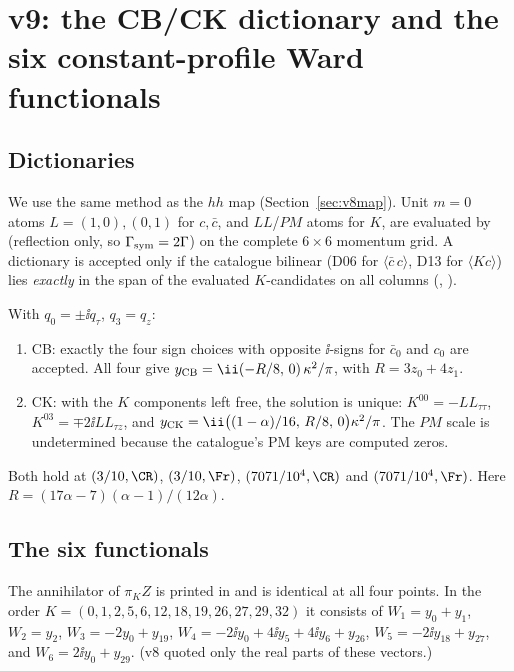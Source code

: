 \section{v9: the CB/CK dictionary and the six constant-profile Ward functionals}
\label{sec:v9ghost}

\subsection{Dictionaries}

We use the same method as the \(hh\) map (Section~\ref{sec:v8map}).
Unit \(m=0\) atoms \(L=(1,0),(0,1)\) for \(c,\bar c\), and
\(LL\)/\(PM\) atoms for \(K\), are evaluated by 
(reflection only, so \(\Gamma_{\rm sym}=2\Gamma\)) on the complete
\(6\times6\) momentum grid. A dictionary is accepted only if the
catalogue bilinear (D06 for \(\langle\bar c\,c\rangle\), D13 for
\(\langle K c\rangle\)) lies \emph{exactly} in the span of the
evaluated \(K\)-candidates on all columns
(, ).

\begin{proposition}
\label{prop:v9dict}
With \(q_0=\pm\ii q_\tau\), \(q_3=q_z\):
\begin{enumerate}[label=(\roman*)]
\item CB: exactly the four sign choices with opposite \(\ii\)-signs
for \(\bar c_0\) and \(c_0\) are accepted. All four give
\(y_{\rm CB}=\ii(-R/8,\,0)\,\kappa^2/\pi\), with \(R=3z_0+4z_1\).
\item CK: with the \(K\) components left free, the solution is
unique: \(K^{00}=-LL_{\tau\tau}\), \(K^{03}=\mp2\ii LL_{\tau z}\), and
\(y_{\rm CK}=\ii\bigl((1-\alpha)/16,\,R/8,\,0\bigr)\kappa^2/\pi\).
The \(PM\) scale is undetermined because the catalogue's PM keys
are computed zeros.
\end{enumerate}
Both hold at \((3/10,\CR)\), \((3/10,\Fr)\), \((7071/10^4,\CR)\) and
\((7071/10^4,\Fr)\). Here
\(R=(17\alpha-7)(\alpha-1)/(12\alpha)\).
\end{proposition}

\subsection{The six functionals}

The annihilator of \(\pi_KZ\) is printed in
 and is identical at all four
points. In the order
\(K=(0,1,2,5,6,12,18,19,26,27,29,32)\) it consists of
\(W_1=y_0+y_1\), \(W_2=y_2\), \(W_3=-2y_0+y_{19}\),
\(W_4=-2\ii y_0+4\ii y_5+4\ii y_6+y_{26}\),
\(W_5=-2\ii y_{18}+y_{27}\), and \(W_6=2\ii y_0+y_{29}\). (v8
quoted only the real parts of these vectors.)

